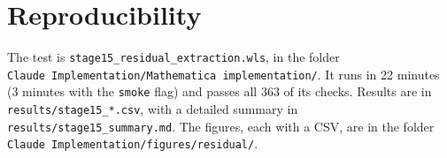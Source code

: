 \documentclass[11pt,a4paper]{article}
\newcommand{\code}[1]{\texttt{#1}}
\begin{document}
\section{Reproducibility}
The test is \code{stage15\_residual\_extraction.wls}, in the folder\\ \code{Claude Implementation/Mathematica implementation/}.
It runs in 22 minutes (3 minutes with the \code{smoke} flag) and passes all 363 of its checks.
Results are in \code{results/stage15\_*.csv}, with a detailed summary in \code{results/stage15\_summary.md}.
The figures, each with a CSV, are in the folder \code{Claude Implementation/figures/residual/}.
\end{document}
